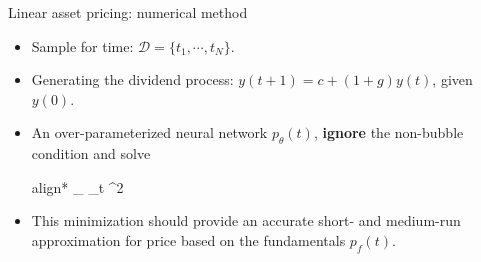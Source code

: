 \documentclass[aspectratio=169,10pt]{beamer}
\newcommand{\emphcolor}[1]{\textbf{\textcolor{emphcolorval}{#1}}}
\begin{document}
\begin{frame}{Linear asset pricing: numerical method}
	\begin{itemize}
		\item Sample for time:  $\mathcal{D} = \{t_1,\cdots,t_N\}$.
		\item Generating the dividend process: $y(t+1) = c+(1+g)y(t)$, given $y(0)$.
		\item An over-parameterized neural network $p_\theta(t)$, \emphcolor{ignore} the non-bubble condition and solve 
				\begin{empheq}[box=\tcbhighmath]{align*}
				\min_{\theta} \sum_{t \in {}} ^2
			\end{empheq}
		\item This minimization should provide an accurate short- and medium-run approximation for price based on the fundamentals $p_f(t)$.
	\end{itemize}
	
\end{frame}
\end{document}
